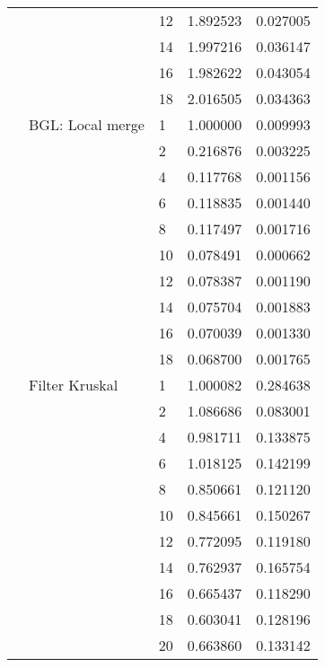 \begin{tabular}{lllrr}
                      &            & 12 &  1.892523 &  0.027005 \\
                      &            & 14 &  1.997216 &  0.036147 \\
                      &            & 16 &  1.982622 &  0.043054 \\
                      &            & 18 &  2.016505 &  0.034363 \\
                      & BGL: Local merge & 1  &  1.000000 &  0.009993 \\
                      &            & 2  &  0.216876 &  0.003225 \\
                      &            & 4  &  0.117768 &  0.001156 \\
                      &            & 6  &  0.118835 &  0.001440 \\
                      &            & 8  &  0.117497 &  0.001716 \\
                      &            & 10 &  0.078491 &  0.000662 \\
                      &            & 12 &  0.078387 &  0.001190 \\
                      &            & 14 &  0.075704 &  0.001883 \\
                      &            & 16 &  0.070039 &  0.001330 \\
                      &            & 18 &  0.068700 &  0.001765 \\
                      & Filter Kruskal & 1  &  1.000082 &  0.284638 \\
                      &            & 2  &  1.086686 &  0.083001 \\
                      &            & 4  &  0.981711 &  0.133875 \\
                      &            & 6  &  1.018125 &  0.142199 \\
                      &            & 8  &  0.850661 &  0.121120 \\
                      &            & 10 &  0.845661 &  0.150267 \\
                      &            & 12 &  0.772095 &  0.119180 \\
                      &            & 14 &  0.762937 &  0.165754 \\
                      &            & 16 &  0.665437 &  0.118290 \\
                      &            & 18 &  0.603041 &  0.128196 \\
                      &            & 20 &  0.663860 &  0.133142 \\

\end{tabular}
